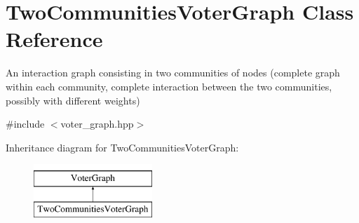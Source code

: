 \hypertarget{classTwoCommunitiesVoterGraph}{\section{Two\-Communities\-Voter\-Graph Class Reference}
\label{classTwoCommunitiesVoterGraph}
}


An interaction graph consisting in two communities of nodes (complete graph within each community, complete interaction between the two communities, possibly with different weights)  




{\ttfamily \#include $<$voter\-\_\-graph.\-hpp$>$}

Inheritance diagram for Two\-Communities\-Voter\-Graph\-:\begin{figure}[H]
\begin{center}
\leavevmode
\includegraphics[height=2.000000cm]{classTwoCommunitiesVoterGraph}
\end{center}
\end{figure}
